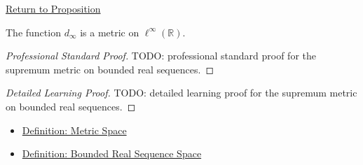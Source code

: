 \newpage
{}
\label{prf:bounded-real-sequence-space-sup-metric}

\begin{remark*}[Return]
\hyperref[prop:bounded-real-sequence-space-sup-metric]{Return to Proposition}
\end{remark*}

\begin{proposition*}
The function \(d_\infty\) is a metric on \(\ell^\infty(\mathbb{R})\).
\end{proposition*}

\begin{proof}[Professional Standard Proof]
\LRAProofBodyStart
TODO: professional standard proof for the supremum metric on bounded real
sequences.
\end{proof}

\begin{proof}[Detailed Learning Proof]
\LRAProofBodyStart
TODO: detailed learning proof for the supremum metric on bounded real
sequences.
\end{proof}

\begin{remark*}
\end{remark*}

\begin{dependencies}
\begin{itemize}
  \item \hyperref[def:metric-space]{Definition: Metric Space}
  \item \hyperref[def:bounded-real-sequence-space]{Definition: Bounded Real Sequence Space}
\end{itemize}
\end{dependencies}

\clearpage
